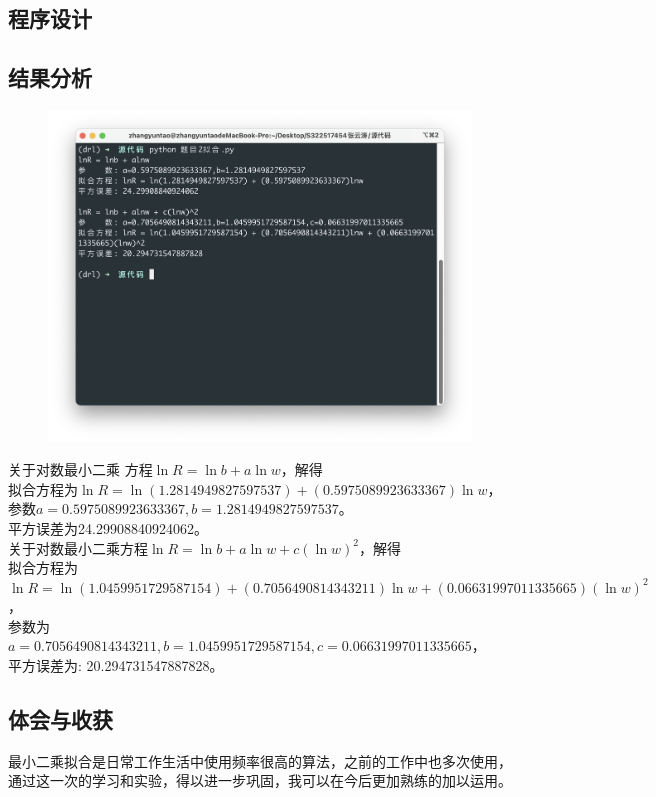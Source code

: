\documentclass{article}
\begin{document}
\subsection{程序设计}


\subsection{结果分析}
\begin{figure}[H]
    \centering
    \includegraphics[width=\textwidth]{相关资源/图片/题目2拟合运行结果.png} 
\end{figure}
关于对数最小二乘
方程$\ln R = \ln b + a\ln w$，解得 \\
拟合方程为$\ln R=\ln(1.2814949827597537)+(0.5975089923633367)\ln w$，\\
参数$a=0.5975089923633367,b=1.2814949827597537$。\\
平方误差为24.29908840924062。 \\ 

关于对数最小二乘方程$\ln R=\ln b+a\ln w+c(\ln w)^2$，解得 \\
拟合方程为$\ln R=\ln(1.0459951729587154)+(0.7056490814343211)\ln w+(0.06631997011335665)(\ln w)^2$，\\
参数为$a=0.7056490814343211,b=1.0459951729587154,c=0.06631997011335665$，\\
平方误差为: 20.294731547887828。

\subsection{体会与收获}
最小二乘拟合是日常工作生活中使用频率很高的算法，之前的工作中也多次使用，
通过这一次的学习和实验，得以进一步巩固，我可以在今后更加熟练的加以运用。
\end{document}
